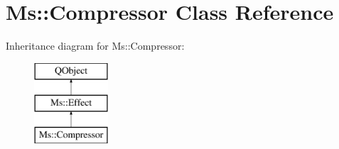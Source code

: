 \hypertarget{class_ms_1_1_compressor}{}\section{Ms\+:\+:Compressor Class Reference}
\label{class_ms_1_1_compressor}
Inheritance diagram for Ms\+:\+:Compressor\+:\begin{figure}[H]
\begin{center}
\leavevmode
\includegraphics[height=3.000000cm]{class_ms_1_1_compressor}
\end{center}
\end{figure}
